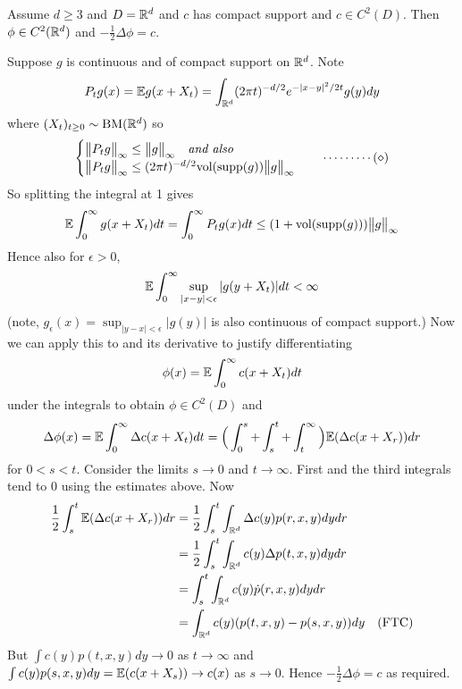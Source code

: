\documentclass[12pt,a4paper]{report}
\newenvironment{proof}
{\begin{changemargin}{1cm}{0.5cm} 
	}%
	{\end{changemargin}
}
\begin{document}
 Assume $d\geq 3$ and $D= \mathbb{R}^d$ and $c$ has compact support and $c\in C^2(D)$. Then $\phi \in C^2(\mathbb{R}^d)$ and $-\frac{1}{2} \Delta \phi =c$.
\begin{proof}
\pf Suppose $g$ is continuous and of compact support on $\mathbb{R}^d$. Note
\begin{align*}
P_t g(x) = \mathbb{E} g(x+X_t) = \int_{\mathbb{R}^d} (2\pi t)^{-d/2} e^{-|x-y|^2/2t} g(y) dy
\end{align*}
where $(X_t)_{t\geq 0} \sim \text{BM}(\mathbb{R}^d)$ so 
\begin{align*}
\begin{cases}
\bigl\lVert P_t g\bigr\rVert_{\infty}  \leq \bigl\lVert g\bigr\rVert_{\infty} \quad \text{\emph{and also}} \\
\bigl\lVert P_t g\bigr\rVert_{\infty} \leq (2\pi t)^{-d/2} \text{vol}(\text{supp}(g)) \bigl\lVert g\bigr\rVert_{\infty}
\end{cases} \quad \cdots \cdots\cdots (\diamond)
\end{align*}
So splitting the integral at 1 gives
\begin{align*}
\mathbb{E} \int_0^{\infty} g(x+X_t) dt = \int_0^{\infty} P_t g(x) dt \leq (1+ \text{vol}(\text{supp}(g))) \bigl\lVert g\bigr\rVert_{\infty}
\end{align*}
Hence also for $\epsilon >0$,
\begin{align*}
\mathbb{E} \int_0^{\infty} \sup_{|x-y|< \epsilon} |g(y+X_t)| dt < \infty
\end{align*}
(note, $g_{\epsilon}(x) = \sup_{|y-x| < \epsilon } |g(y)|$ is also continuous of compact support.) Now we can apply this to and its derivative to justify differentiating
\begin{align*}
\phi(x) = \mathbb{E} \int_0^{\infty} c(x+X_t) dt
\end{align*}
under the integrals to obtain $\phi \in C^2(D)$ and 
\begin{align*}
\Delta  \phi(x) = \mathbb{E} \int_0^{\infty} \Delta c(x+X_t) dt = \Big( \int_0^s + \int_s^t + \int_t^{\infty} \Big) \mathbb{E}(\Delta c(x+X_r)) dr
\end{align*} 
for $0<s<t$. Consider the limits $s\rightarrow 0$ and $t\rightarrow \infty$. First and the third integrals tend to 0 using the estimates above. Now
\begin{align*}
\frac{1}{2} \int_s^t  \mathbb{E}(\Delta c(x+X_r)) dr &= \frac{1}{2} \int_s^t \int_{\mathbb{R}^d} \Delta c(y) p(r,x,y) dydr \\
&= \frac{1}{2} \int_s^t \int_{\mathbb{R}^d} c(y) \Delta p(t,x,y) dy dr \\
& = \int_s^t \int_{\mathbb{R}^d} c(y) \dot{p} (r,x,y) dydr \\
&= \int_{\mathbb{R}^d} c(y) (p(t,x,y)-p(s,x,y)) dy \quad (\text{FTC})
\end{align*}
But $\int c(y) p(t,x,y) dy \rightarrow 0$ as $t\rightarrow \infty$ and $\int c(y)p(s,x,y) dy = \mathbb{E} (c(x+X_s)) \rightarrow c(x)$ as $s\rightarrow 0$. Hence $-\frac{1}{2} \Delta \phi =c$ as required.

\eop 
\end{proof}
\s
\end{document}
